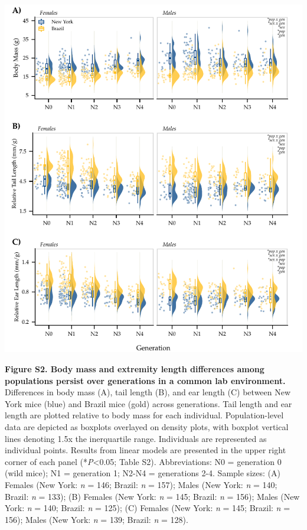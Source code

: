 \documentclass[
]{article}
\begin{document}
\newpage

\includegraphics{../results/figures/Generations_relative_N0-N4.pdf}

\textbf{Figure S2. Body mass and extremity length differences among
populations persist over generations in a common lab environment.}
Differences in body mass (A), tail length (B), and ear length (C)
between New York mice (blue) and Brazil mice (gold) across generations.
Tail length and ear length are plotted relative to body mass for each
individual. Population-level data are depicted as boxplots overlayed on
density plots, with boxplot vertical lines denoting 1.5x the
inerquartile range. Individuals are represented as individual points.
Results from linear models are presented in the upper right corner of
each panel (*\emph{P}\textless0.05; Table S2). Abbreviations: N0 =
generation 0 (wild mice); N1 = generation 1; N2-N4 = generations 2-4.
Sample sizes: (A) Females (New York: \emph{n} = 146; Brazil: \emph{n} =
157); Males (New York: \emph{n} = 140; Brazil: \emph{n} = 133); (B)
Females (New York: \emph{n} = 145; Brazil: \emph{n} = 156); Males (New
York: \emph{n} = 140; Brazil: \emph{n} = 125); (C) Females (New York:
\emph{n} = 145; Brazil: \emph{n} = 156); Males (New York: \emph{n} =
139; Brazil: \emph{n} = 128).
\end{document}
